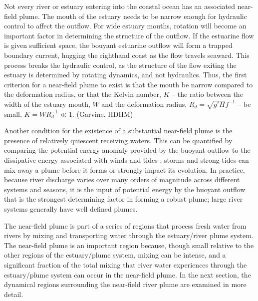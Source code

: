 \documentclass[12pt]{article}
\begin{document}


Not every river or estuary entering into the coastal ocean has an associated near-field plume. The mouth of the estuary needs to be narrow enough for hydraulic control to affect the outflow. For wide estuary mouths, rotation will become an important factor in determining the structure of the outflow. If the estuarine flow is given sufficient space, the bouyant estuarine outflow will form a trapped boundary current, hugging the righthand coast as the flow travels seaward. This process breaks the hydraulic control, as the structure of the flow exiting the estuary is determined by rotating dynamics, and not hydraulics. Thus, the first criterion for a near-field plume to exist is that the mouth be narrow compared to the deformation radius, or that the Kelvin number, $K$ -- the ratio between the width of the estuary mouth, $W$ and the deformation radius, $R_d = \sqrt{g' H} f^{-1}$ -- be small, $K = W R_d^{-1} \ll 1$. (Garvine, HDHM)

Another condition for the existence of a substantial near-field plume is the presence of relatively quiescent receiving waters. This can be quantified by comparing the potential energy anomaly provided by the buoyant outflow to the dissipative energy associated with winds and tides \citep{pritchard.huntley:02}; storms and strong tides can mix away a plume before it forms or strongly impact its evolution. In practice, because river discharge varies over many orders of magnitude across different systems and seasons, it is the input of potential energy by the buoyant outflow that is the strongest determining factor in forming a robust plume; large river systems generally have well defined plumes.

The near-field plume is part of a series of regions that process fresh water from rivers by mixing and transporting water through the estuary/river plume system. The near-field plume is an important region because, though small relative to the other regions of the estuary/plume system, mixing can be intense, and a significant fraction of the total mixing that river water experiences through the estuary/plume system can occur in the near-field plume. In the next section, the dynamical regions surrounding the near-field river plume are examined in more detail.
\end{document}
